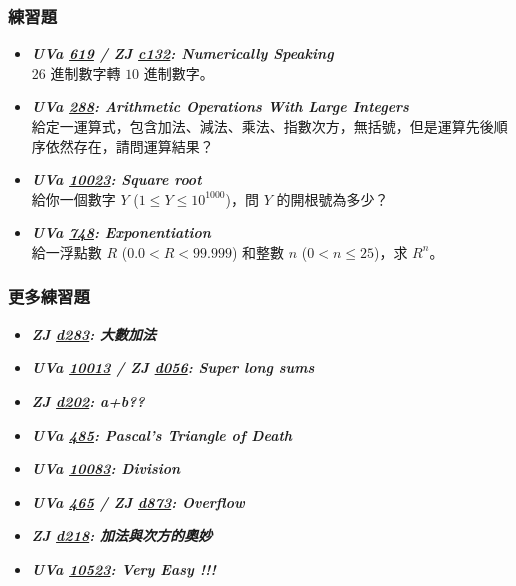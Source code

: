 \subsubsection*{練習題}
\begin{itemize}[label={\Checkmark}]
\item \textbf{\textit{UVa \href{http://uva.onlinejudge.org/external/6/619.html}{619} / ZJ \href{http://zerojudge.tw/ShowProblem?problemid=c132}{c132}: Numerically Speaking}}\\
$26$ 進制數字轉 $10$ 進制數字。
\item \textbf{\textit{UVa \href{http://uva.onlinejudge.org/external/2/288.html}{288}: Arithmetic Operations With Large Integers}}\\
給定一運算式，包含加法、減法、乘法、指數次方，無括號，但是運算先後順序依然存在，請問運算結果？
\item \textbf{\textit{UVa \href{http://uva.onlinejudge.org/external/100/10023.html}{10023}: Square root}}\\
給你一個數字 $Y$ ($1\leq{Y}\leq{10^{1000}}$)，問 $Y$ 的開根號為多少？
\item \textbf{\textit{UVa \href{http://uva.onlinejudge.org/external/7/748.html}{748}: Exponentiation}}\\
給一浮點數 $R$ ($0.0<R<99.999$) 和整數 $n$ ($0<n\leq{25}$)，求 $R^n$。
\end{itemize}
\subsubsection*{更多練習題}
\begin{itemize}[label={\PencilLeftDown}]
\item \textbf{\textit{ZJ \href{http://zerojudge.tw/ShowProblem?problemid=d283}{d283}: 大數加法}}
\item \textbf{\textit{UVa \href{http://uva.onlinejudge.org/external/100/10013.html}{10013} / ZJ \href{http://zerojudge.tw/ShowProblem?problemid=d056}{d056}: Super long sums}}
\item \textbf{\textit{ZJ \href{http://zerojudge.tw/ShowProblem?problemid=d202}{d202}: a+b??}}
\item \textbf{\textit{UVa \href{http://uva.onlinejudge.org/external/4/485.html}{485}: Pascal's Triangle of Death}}
\item \textbf{\textit{UVa \href{http://uva.onlinejudge.org/external/100/10083.html}{10083}: Division}}
\item \textbf{\textit{UVa \href{http://uva.onlinejudge.org/external/4/465.html}{465} / ZJ \href{http://zerojudge.tw/ShowProblem?problemid=d873}{d873}: Overflow}}
\item \textbf{\textit{ZJ \href{http://zerojudge.tw/ShowProblem?problemid=d218}{d218}: 加法與次方的奧妙}}
\item \textbf{\textit{UVa \href{http://uva.onlinejudge.org/external/105/10523.html}{10523}: Very Easy !!!}}
\end{itemize}